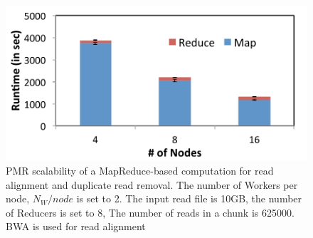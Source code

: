 \documentclass{acm_proc_article-sp}
\begin{document}


\begin{figure}
 \centering
\includegraphics[scale=0.50]{figures/pj-smr-scale.pdf}
\caption{\small PMR scalability of a MapReduce-based computation for read alignment and duplicate read removal.  The number of Workers per node, $N_{W}/node$ is set to 2.   The input read file is 10GB, the number of Reducers is set to 8, The number of reads in a chunk is 625000. BWA is used for read alignment}
  \label{fig:scale-p-saga-mr} 
\end{figure}
\end{document}
